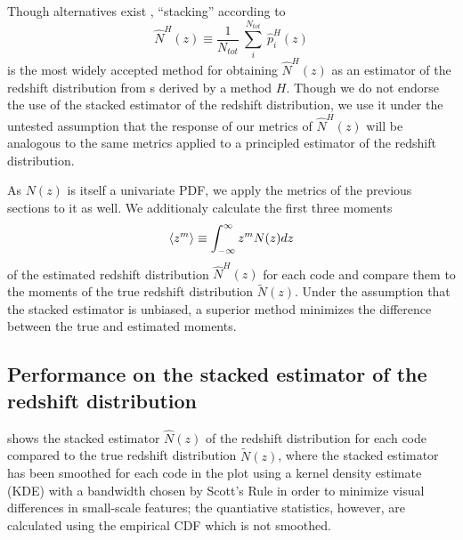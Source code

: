 Though alternatives exist \citep{Malz:chippr}, ``stacking'' according to
\begin{equation}
\label{eq:stacked}
\hat{N}^{H}(z) \equiv \frac{1}{N_{tot}}\ \sum_{i}^{N_{tot}}\ \hat{p}^{H}_{i}(z)
\end{equation}
is the most widely accepted method for obtaining $\hat{N}^{H}(z)$ as an estimator of the redshift distribution from \pzpdf s derived by a method $H$.
Though we do not endorse the use of the stacked estimator of the redshift distribution, we use it under the untested assumption that the response of our metrics of $\hat{N}^{H}(z)$ will be analogous to the same metrics applied to a principled estimator of the redshift distribution.

As $N(z)$ is itself a univariate PDF, we apply the metrics of the previous sections to it as well.
We additionaly calculate the first three moments
\begin{equation}
\eqlabel{eq:moment}
\langle z^{m}\rangle \equiv \int_{-\infty}^{\infty} z^{m} N(z) dz
\end{equation}
of the estimated redshift distribution $\hat{N}^{H}(z)$ for each code and compare them to the moments of the true redshift distribution $\tilde{N}(z)$.
Under the assumption that the stacked estimator is unbiased, a superior method minimizes the difference between the true and estimated moments.

\subsection{Performance on the stacked estimator of the redshift distribution}

 shows the stacked estimator $\hat{N}(z)$ of the redshift distribution for each code compared to the true redshift distribution $\tilde{N}(z)$, where the stacked estimator has been smoothed for each code in the plot using a kernel density estimate (KDE) with a bandwidth chosen by Scott's Rule \citep{Scott:1992} in order to minimize visual differences in small-scale features; the quantiative statistics, however, are calculated using the empirical CDF which is not smoothed.

